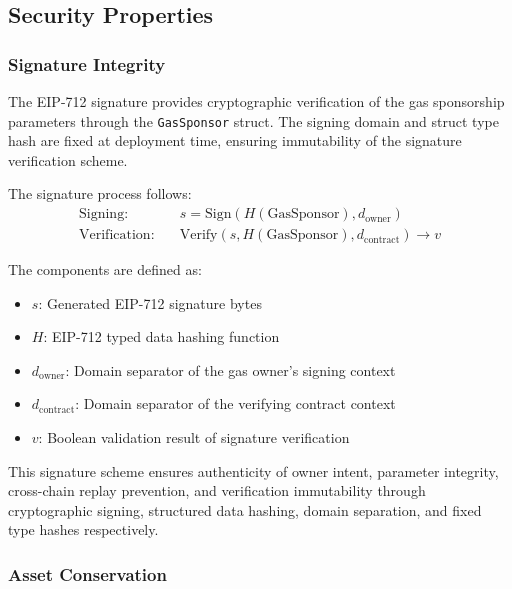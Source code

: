 %



\subsection{Security Properties}
\subsubsection{Signature Integrity}
The EIP-712 signature provides cryptographic verification of the gas sponsorship parameters through the
\texttt{GasSponsor} struct. The signing domain and struct type hash are fixed at deployment time, ensuring
immutability of the signature verification scheme.

The signature process follows:
\begin{equation*}
\begin{aligned}
\text{Signing}: & \quad s = \text{Sign}(H(\text{GasSponsor}), d_{\text{owner}}) \\
\text{Verification}: & \quad \text{Verify}(s, H(\text{GasSponsor}), d_{\text{contract}}) \rightarrow v
\end{aligned}
\end{equation*}

The components are defined as:
\begin{itemize}
\item $s$: Generated EIP-712 signature bytes
\item $H$: EIP-712 typed data hashing function
\item $d_{\text{owner}}$: Domain separator of the gas owner's signing context
\item $d_{\text{contract}}$: Domain separator of the verifying contract context
\item $v$: Boolean validation result of signature verification
\end{itemize}

This signature scheme ensures authenticity of owner intent, parameter integrity, cross-chain replay prevention, and verification
immutability through cryptographic signing, structured data hashing, domain separation, and fixed type hashes respectively.\\







\subsubsection{Asset Conservation}

